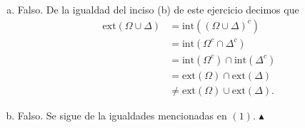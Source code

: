 \documentclass[12pt]{article}
\begin{document}
\begin{enumerate}
\begin{enumerate}[(a)]
    $B_r(x)\subset \Delta$. En consecuencia, $x \in \text{int}(\Omega)$ y $x \in \text{int}(\Delta)$. Se sigue que $x \in \text{int}(\Omega)\cap\text{int}(\Delta)$, y por lo tanto,
    $\text{int}(\Omega\cap\Delta) \subset \text{int}(\Omega)\cap\text{int}(\Delta)$. Tomemos ahora $x \in \text{int}(\Omega)\cap\text{int}(\Delta)$. De dicha pertenencia, se sigue que existen $r_1.r_2>0$
    tales que $B_{r_1}(x)\subset \Omega$ y $B_{r_2}(x)\subset \Delta$. Tomése $r=\min\{r_1,r_2\}$. Así, se sigue que $B_{r}(x)\subset \Omega$ y $B_r(x)\subset \Delta$. Luego, $B_{r}(x)\subset \Omega \cap \Delta$,
    y en adición $x \in \text{int}(\Omega\cap \Delta)$, de lo que se sigue $\text{int}(\Omega)\cap\text{int}(\Delta)\subset \text{int}(\Omega\cap \Delta)$. De ello y por la contención ya antes dicha, concluimos que
    $\text{int}(\Omega)\cap\text{int}(\Delta)=\text{int}(\Omega\cap \Delta)$.
    \item Falso. De la igualdad del inciso (b) de este ejercicio decimos que
    \begin{align*}
        \text{ext}(\Omega\cup \Delta) &= \text{int}((\Omega\cup\Delta)^c)\\
        &= \text{int}(\Omega^c\cap \Delta^c) \\
        &= \text{int}(\Omega^c)\cap \text{int}(\Delta^c) \\
        &= \text{ext}(\Omega)\cap \text{ext}(\Delta) \\
        &\neq \text{ext}(\Omega)\cup \text{ext}(\Delta). \tag{1}
    \end{align*}
    \item Falso. Se sigue de la igualdades mencionadas en $(1)$. $\blacktriangle$
\end{enumerate}



\end{enumerate}
\end{document}
